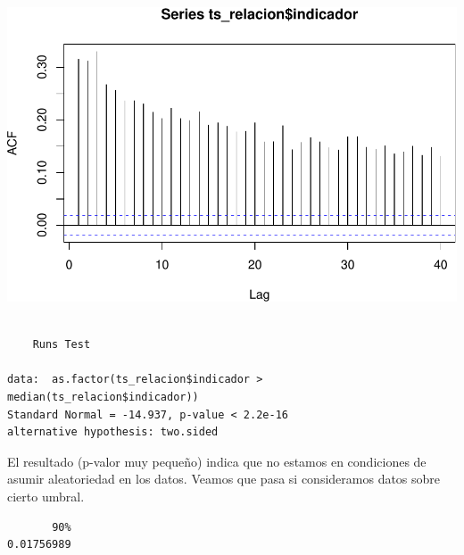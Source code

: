 \documentclass[
  12pt]{article}
\newenvironment{Shaded}{\begin{snugshade}}{\end{snugshade}}
\newcommand{\FloatTok}[1]{\textcolor[rgb]{0.00,0.00,0.81}{#1}}
\newcommand{\FunctionTok}[1]{\textcolor[rgb]{0.13,0.29,0.53}{\textbf{#1}}}
\newcommand{\NormalTok}[1]{#1}
\newcommand{\OtherTok}[1]{\textcolor[rgb]{0.56,0.35,0.01}{#1}}
\newcommand{\SpecialCharTok}[1]{\textcolor[rgb]{0.81,0.36,0.00}{\textbf{#1}}}
\begin{document}
\includegraphics{Entrega_files/figure-latex/unnamed-chunk-56-1.pdf}

\begin{Shaded}
\end{Shaded}

\begin{verbatim}

    Runs Test

data:  as.factor(ts_relacion$indicador > median(ts_relacion$indicador))
Standard Normal = -14.937, p-value < 2.2e-16
alternative hypothesis: two.sided
\end{verbatim}

El resultado (p-valor muy pequeño) indica que no estamos en condiciones
de asumir aleatoriedad en los datos. Veamos que pasa si consideramos
datos sobre cierto umbral.

\begin{Shaded}
\end{Shaded}

\begin{verbatim}
       90% 
0.01756989 
\end{verbatim}
\end{document}
